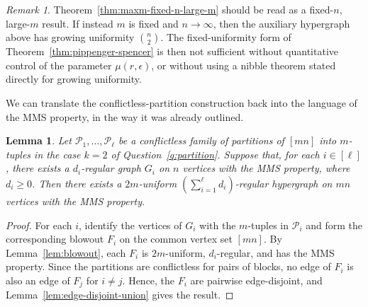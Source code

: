 \documentclass[12pt,UKenglish]{amsart}
\theoremstyle{plain}
\newtheorem{lemma}[thm]{Lemma}
\theoremstyle{definition}
\theoremstyle{remark}
\newtheorem{rem}[thm]{Remark}
\begin{document}
\begin{rem}\label{rem:nibble-gap}
Theorem~\ref{thm:maxm-fixed-n-large-m} should be read as a fixed-$n$, large-$m$ result. If instead $m$ is fixed and $n\to\infty$, then the auxiliary hypergraph above has growing uniformity $\binom n2$. The fixed-uniformity form of Theorem~\ref{thm:pippenger-spencer} is then not sufficient without quantitative control of the parameter $\mu(r,\epsilon)$, or without using a nibble theorem stated directly for growing uniformity.
\end{rem}

We can translate the conflictless-partition construction back into the language of the MMS property, in the way it was already outlined.
 \begin{lemma}\label{lem:blowout-union-general}
Let $\mathcal{P}_1,\dots,\mathcal{P}_\ell$ be a conflictless family of partitions of $[mn]$ into $m$-tuples in the case $k=2$ of Question~\ref{q:partition}. Suppose that, for each $i\in[\ell]$, there exists a $d_i$-regular graph $G_i$ on $n$ vertices with the MMS property, where $d_i\ge0$. Then there exists a $2m$-uniform $\left(\sum_{i=1}^\ell d_i\right)$-regular hypergraph on $mn$ vertices with the MMS property.
 \end{lemma}
\begin{proof}
For each $i$, identify the vertices of $G_i$ with the $m$-tuples in $\mathcal{P}_i$ and form the corresponding blowout $F_i$ on the common vertex set $[mn]$. By Lemma~\ref{lem:blowout}, each $F_i$ is $2m$-uniform, $d_i$-regular, and has the MMS property. Since the partitions are conflictless for pairs of blocks, no edge of $F_i$ is also an edge of $F_j$ for $i\neq j$. Hence, the $F_i$ are pairwise edge-disjoint, and Lemma~\ref{lem:edge-disjoint-union} gives the result.
\end{proof}
\end{document}
